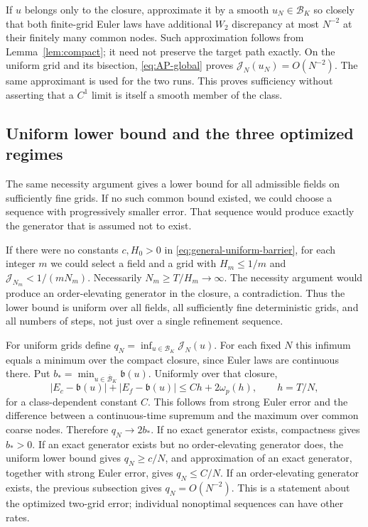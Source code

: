 If $u$ belongs only to the closure, approximate it by a smooth
$u_N\in\mathcal B_K$ so closely that both finite-grid Euler laws have
additional $W_2$ discrepancy at most $N^{-2}$ at their finitely many common
nodes. Such approximation follows from Lemma~\ref{lem:compact}; it need
not preserve the target path exactly. On the uniform grid and its
bisection, \eqref{eq:AP-global} proves $\mathcal J_N(u_N)=O(N^{-2})$.
The same approximant is used for the two runs. This proves sufficiency
without asserting that a $C^1$ limit is itself a smooth member of the class.

\subsection{Uniform lower bound and the three optimized regimes}
The same necessity argument gives a lower bound for all admissible fields
on sufficiently fine grids. If no such common bound existed, we could
choose a sequence with progressively smaller error. That sequence would
produce exactly the generator that is assumed not to exist.

If there were no constants $c,H_0>0$ in
\eqref{eq:general-uniform-barrier}, for each integer $m$ we could select a
field and a grid with $H_m\le1/m$ and
$\mathcal J_{N_m}<1/(mN_m)$. Necessarily $N_m\ge T/H_m\to\infty$.
The necessity argument would produce an order-elevating generator in
the closure, a contradiction. Thus the lower bound is uniform over all
fields, all sufficiently fine deterministic grids, and all numbers of
steps, not just over a single refinement sequence.

For uniform grids define $q_N=\inf_{u\in\mathcal B_K}\mathcal J_N(u)$.
For each fixed $N$ this infimum equals a minimum over the compact closure,
since Euler laws are continuous there. Put
$b_*=\min_{u\in\overline{\mathcal B}_K}\mathfrak b(u)$.
Uniformly over that closure,
\[
 |E_c-\mathfrak b(u)|+|E_f-\mathfrak b(u)|
 \le C h+2\omega_p(h),\qquad h=T/N,
\]
for a class-dependent constant $C$. This follows from strong Euler error
and the difference between a continuous-time supremum and the maximum
over common coarse nodes. Therefore $q_N\to2b_*$.
If no exact generator exists, compactness gives $b_*>0$.
If an exact generator exists but no order-elevating generator does, the
uniform lower bound gives $q_N\ge c/N$, and approximation of an exact
generator, together with strong Euler error, gives $q_N\le C/N$.
If an order-elevating generator exists, the previous subsection gives
$q_N=O(N^{-2})$. This is a statement about the optimized two-grid error;
individual nonoptimal sequences can have other rates.

